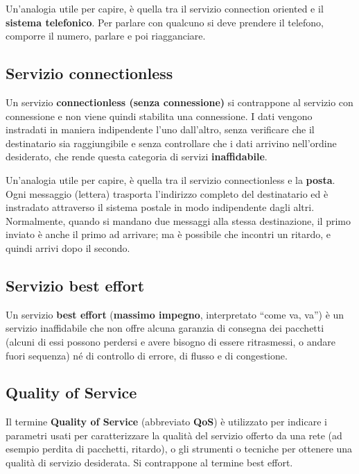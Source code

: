        Un’analogia utile per capire, è quella tra il servizio connection oriented e il \textbf{sistema telefonico}.
        Per parlare con qualcuno si deve prendere il telefono, comporre il numero, parlare e poi
        riagganciare.

        \subsection{Servizio connectionless}
        Un servizio \textbf{connectionless (senza connessione)} si contrappone al servizio con connessione
        e non viene quindi stabilita una connessione. I dati vengono instradati in maniera indipendente
        l’uno dall’altro, senza verificare che il destinatario sia raggiungibile e senza controllare che i
        dati arrivino nell’ordine desiderato, che rende questa categoria di servizi \textbf{inaffidabile}.\newline

        Un’analogia utile per capire, è quella tra il servizio connectionless e la \textbf{posta}. Ogni messaggio
        (lettera) trasporta l’indirizzo completo del destinatario ed è instradato attraverso il sistema
        postale in modo indipendente dagli altri. Normalmente, quando si mandano due messaggi alla
        stessa destinazione, il primo inviato è anche il primo ad arrivare; ma è possibile che incontri un
        ritardo, e quindi arrivi dopo il secondo.

        \subsection{Servizio best effort}
        Un servizio \textbf{best effort} (\textbf{massimo impegno}, interpretato “come va, va”) è un servizio
        inaffidabile che non offre alcuna garanzia di consegna dei pacchetti (alcuni di essi possono
        perdersi e avere bisogno di essere ritrasmessi, o andare fuori sequenza) né di controllo di
        errore, di flusso e di congestione.

        \subsection{Quality of Service}
        Il termine \textbf{Quality of Service} (abbreviato \textbf{QoS}) è utilizzato per indicare i parametri usati per
        caratterizzare la qualità del servizio offerto da una rete (ad esempio perdita di pacchetti,
        ritardo), o gli strumenti o tecniche per ottenere una qualità di servizio desiderata. Si
        contrappone al termine best effort.

